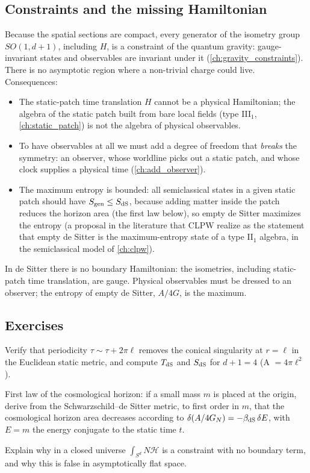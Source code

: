 \subsection{Constraints and the missing Hamiltonian}

Because the spatial sections are compact, every generator of the isometry group $SO(1,d+1)$, including $H$, is a constraint of the quantum gravity: gauge-invariant states and observables are invariant under it (\cref{ch:gravity_constraints}). There is no asymptotic region where a non-trivial charge could live. Consequences:
\begin{itemize}
\item The static-patch time translation $H$ cannot be a physical Hamiltonian; the algebra of the static patch built from bare local fields (type III$_1$, \cref{ch:static_patch}) is not the algebra of physical observables.
\item To have observables at all we must add a degree of freedom that \emph{breaks} the symmetry: an observer, whose worldline picks out a static patch, and whose clock supplies a physical time (\cref{ch:add_observer}).
\item The maximum entropy is bounded: all semiclassical states in a given static patch should have $S_{\mathrm{gen}}\le S_{\rm dS}$, because adding matter inside the patch reduces the horizon area (the first law below), so empty de Sitter maximizes the entropy (a proposal in the literature that CLPW realize as the statement that empty de Sitter is the maximum-entropy state of a type II$_1$ algebra, in the semiclassical model of \cref{ch:clpw}).
\end{itemize}

\begin{keyidea}
In de Sitter there is no boundary Hamiltonian: the isometries, including static-patch time translation, are gauge. Physical observables must be dressed to an observer; the entropy of empty de Sitter, $A/4G$, is the maximum.
\end{keyidea}

\subsection*{Exercises}
\begin{exercise}\label{ex:ds_special:1}
Verify that periodicity $\tau\sim\tau+2\pi\ell$ removes the conical singularity at $r=\ell$ in the Euclidean static metric, and compute $T_{\rm dS}$ and $S_{\rm dS}$ for $d+1=4$ (A $=4\pi\ell^2$).
\end{exercise}
\begin{exercise}\label{ex:ds_special:2}
First law of the cosmological horizon: if a small mass $m$ is placed at the origin, derive from the Schwarzschild--de Sitter metric, to first order in $m$, that the cosmological horizon area decreases according to $\delta(A/4G_N)=-\beta_{\rm dS}\,\delta E$, with $E=m$ the energy conjugate to the static time $t$.
\end{exercise}
\begin{exercise}\label{ex:ds_special:3}
Explain why in a closed universe $\int_{S^d}N\mathcal H$ is a constraint with no boundary term, and why this is false in asymptotically flat space.
\end{exercise}

